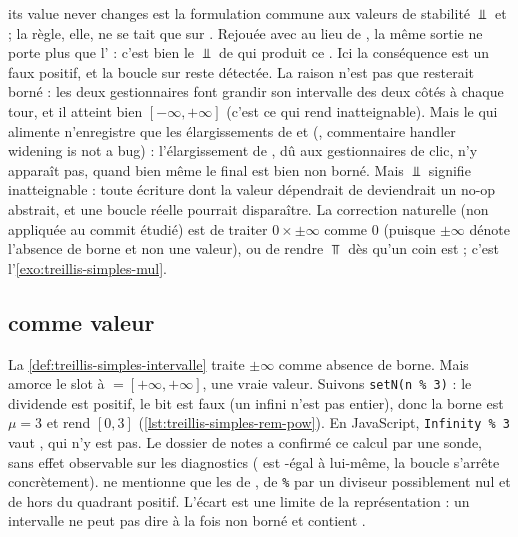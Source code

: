 \og its value never changes\fg{} est la formulation commune aux valeurs de
stabilité $\Bot$ et  ; la règle, elle, ne se tait que sur
. Rejouée avec  au lieu de
, la même sortie ne porte plus que
l' : c'est bien le $\Bot$ de  qui produit ce
. Ici la conséquence est un faux positif, et la boucle
sur  reste détectée. La raison n'est pas que  resterait
borné : les deux gestionnaires font grandir son intervalle des deux côtés à
chaque tour, et il atteint bien $[-\infty,+\infty]$ (c'est ce qui rend
 inatteignable). Mais le  qui alimente
 n'enregistre que les élargissements de
 et 
(, commentaire
\og handler widening is not a bug\fg{}) : l'élargissement de , dû
aux gestionnaires de clic, n'y apparaît pas, quand bien même le 
final est bien non borné. Mais $\Bot$
signifie \og inatteignable\fg{} : toute écriture dont la valeur dépendrait
de  deviendrait un no-op abstrait, et une boucle réelle pourrait
disparaître. La correction naturelle (non appliquée au commit étudié) est
de traiter $0 \times \pm\infty$ comme $0$ (puisque $\pm\infty$ dénote
l'absence de borne et non une valeur), ou de rendre $\Top$ dès qu'un coin
est  ; c'est l'\cref{exo:treillis-simples-mul}.

\subsection{ comme valeur}

La \cref{def:treillis-simples-intervalle} traite $\pm\infty$ comme absence
de borne. Mais  amorce le slot à
 $= [+\infty, +\infty]$, une vraie valeur. Suivons
\texttt{setN(n \% 3)} : le dividende est positif, le bit est faux (un infini
n'est pas entier), donc la borne est $\mu = 3$ et  rend $[0, 3]$
(\cref{lst:treillis-simples-rem-pow}). En JavaScript,
\texttt{Infinity \% 3} vaut , qui n'y est pas. Le dossier de notes a
confirmé ce calcul par une sonde, sans effet observable sur les diagnostics
( est -égal à lui-même, la boucle s'arrête
concrètement).  ne mentionne que les 
de \code{/}, de \texttt{\%} par un diviseur possiblement nul et de \code{**}
hors du quadrant positif. L'écart est une limite de la représentation : un
intervalle ne peut pas dire à la fois \og non borné\fg{} et \og contient
\fg{}.

